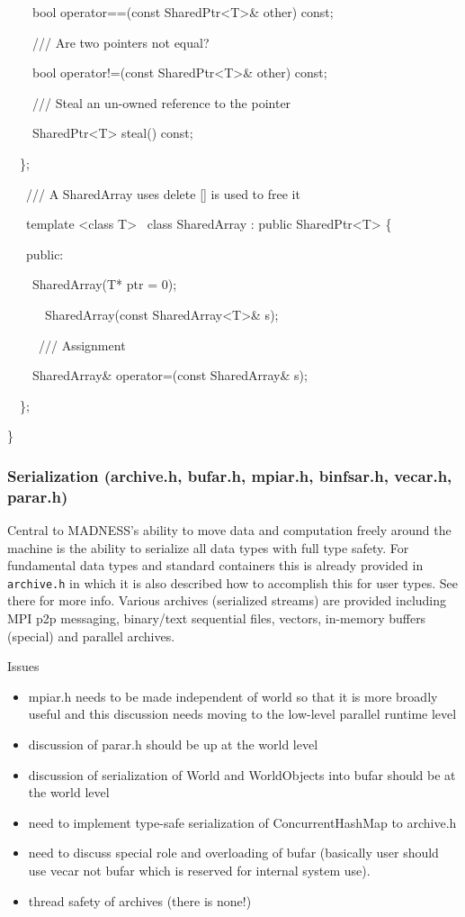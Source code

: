 \documentclass[letterpaper]{article}
\newcommand\liststyleLi{%
\renewcommand\labelitemi{${\bullet}$}
\renewcommand\labelitemii{${\circ}$}
\renewcommand\labelitemiii{${\blacksquare}$}
\renewcommand\labelitemiv{${\bullet}$}
}
\begin{document}
{\ttfamily
\ \ \ \ bool operator==(const SharedPtr{\textless}T{\textgreater}\& other) const;}

{\ttfamily
\ \ \ \ /// Are two pointers not equal?}

{\ttfamily
\ \ \ \ bool operator!=(const SharedPtr{\textless}T{\textgreater}\& other) const;}

{\ttfamily
\ \ \ \ /// Steal an un-owned reference to the pointer }

{\ttfamily
\ \ \ \ SharedPtr{\textless}T{\textgreater} steal() const;}

{\ttfamily
\ \ \};}

{\ttfamily
\ \ \ /// A SharedArray uses delete [] is used to free it}

{\ttfamily
\ \ \ template {\textless}class T{\textgreater} \ class SharedArray : public SharedPtr{\textless}T{\textgreater} \{}

{\ttfamily
\ \ \ public:}

{\ttfamily
\ \ \ \ SharedArray(T* ptr = 0);}

{\ttfamily
\ \ \ \ \ \ SharedArray(const SharedArray{\textless}T{\textgreater}\& s);}

{\ttfamily
\ \ \ \ \ /// Assignment}

{\ttfamily
\ \ \ \ SharedArray\& operator=(const SharedArray\& s);}

{\ttfamily
\ \ \};}

{\ttfamily
\}}

\subsubsection{Serialization (archive.h, bufar.h, mpiar.h, binfsar.h, vecar.h, parar.h)}
Central to MADNESS's ability to move data and computation freely around the machine is the ability to serialize all data
types with full type safety. For fundamental data types and standard containers this is already provided in
\texttt{archive.h} in which it is also described how to accomplish this for user types. See there for more info.
Various archives (serialized streams) are provided including MPI p2p messaging, binary/text sequential files, vectors,
in-memory buffers (special) and parallel archives.

Issues

\liststyleLi
\begin{itemize}
\item mpiar.h needs to be made independent of world so that it is more broadly useful and this discussion needs moving
to the low-level parallel runtime level
\item discussion of parar.h should be up at the world level
\item discussion of serialization of World and WorldObjects into bufar should be at the world level
\item need to implement type-safe serialization of ConcurrentHashMap to archive.h
\item need to discuss special role and overloading of bufar (basically user should use vecar not bufar which is reserved
for internal system use).
\item thread safety of archives (there is none!)
\end{itemize}
\end{document}
